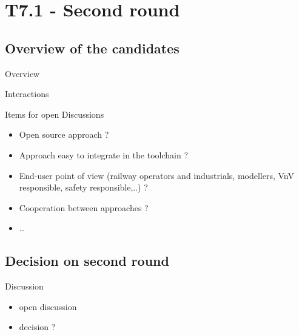 
\section{T7.1 - Second round}


\subsection{Overview of the candidates}


\begin{frame}{Overview}
 
\begin{center}

 
\end{center}

\end{frame}


\begin{frame}{Interactions}
 
\begin{center}

 
\end{center}

\end{frame}


\begin{frame}{Items for open Discussions}
 
\begin{itemize}
\item Open source approach ?
\item Approach easy to integrate in the toolchain ?
\item End-user point of view (railway operators and industrials, modellers, VnV responsible, safety responsible,..) ?
\item Cooperation between approaches ?
\item \dots 
\end{itemize}
\end{frame}


\subsection{Decision on second round}


\begin{frame}{Discussion}

\begin{itemize}
\item open discussion
\item decision ?
\end{itemize}

\end{frame}

